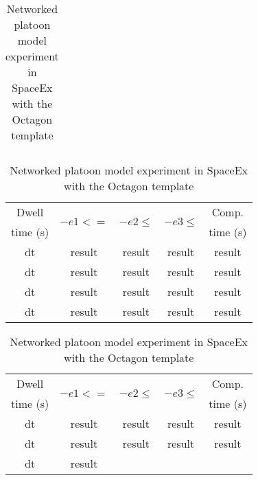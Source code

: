 \begin{table}
\begin{minipage}{0.35\textwidth}
\begin{tabular}{|c|c|}
\end{tabular}
\caption{Large invariant computation: Perturbed double integrator}
\vspace{1em}
\end{minipage}
%
\begin{minipage}{0.45\textwidth}
\begin{tabular}{|c|c|c|c|c|}
\hline
Dwell & \multirow{2}{*}{$-e1<=$} & \multirow{2}{*}{$-e2\leq$} &
\multirow{2}{*}{$-e3\leq$} & Comp.\\
time (s) & & & & time (s)\\
\hline
\multirow{2}{*}{dt} & \multirow{2}{*}{result} &
\multirow{2}{*}{result} & \multirow{2}{*}{result} &
\multirow{2}{*}{result} \\
& & & & \\
\hline
\multirow{2}{*}{dt} & \multirow{2}{*}{result} &
\multirow{2}{*}{result} & \multirow{2}{*}{result} &
\multirow{2}{*}{result} \\
& & & & \\
\hline
\multirow{2}{*}{dt} & \multirow{2}{*}{result} &
\multirow{2}{*}{result} & \multirow{2}{*}{result} &
\multirow{2}{*}{result} \\
& & & & \\
\hline
\multirow{2}{*}{dt} & \multirow{2}{*}{result} &
\multirow{2}{*}{result} & \multirow{2}{*}{result} &
\multirow{2}{*}{result} \\
& & & & \\
\hline
\end{tabular}
\caption{Networked platoon model experiment in SpaceEx with the Octagon template}
\end{minipage}
\hspace{2.5em}
\begin{minipage}{0.45\textwidth}
\begin{tabular}{|c|c|c|c|c|}
\hline
Dwell & \multirow{2}{*}{$-e1<=$} & \multirow{2}{*}{$-e2\leq$} &
\multirow{2}{*}{$-e3\leq$} & Comp.\\
time (s) & & & & time (s)\\
\hline
\multirow{2}{*}{dt} & \multirow{2}{*}{result} &
\multirow{2}{*}{result} & \multirow{2}{*}{result} &
\multirow{2}{*}{result} \\
& & & & \\
\hline
\multirow{2}{*}{dt} & \multirow{2}{*}{result} &
\multirow{2}{*}{result} & \multirow{2}{*}{result} &
\multirow{2}{*}{result} \\
& & & & \\
\hline
\multirow{2}{*}{dt} & \multirow{2}{*}{result} &

\end{tabular}
\end{minipage}
\end{table}
